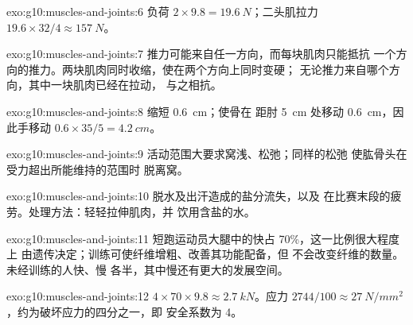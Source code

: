 \begin{solution}{exo:g10:muscles-and-joints:6}
负荷 $2 \times 9.8 = \qty{19.6}{N}$；二头肌拉力 $19.6 \times 32/4
\approx \qty{157}{N}$。
\end{solution}

\begin{solution}{exo:g10:muscles-and-joints:7}
推力可能来自任一方向，而每块肌肉只能抵抗
一个方向的推力。两块肌肉同时收缩，使在两个方向上同时变硬；
无论推力来自哪个方向，其中一块肌肉已经在拉动，
与之相抗。
\end{solution}

\begin{solution}{exo:g10:muscles-and-joints:8}
缩短 \qty{0.6}{cm}；使骨在
距肘 \qty{5}{cm} 处移动 \qty{0.6}{cm}，因此手移动
$0.6 \times 35/5 = \qty{4.2}{cm}$。
\end{solution}

\begin{solution}{exo:g10:muscles-and-joints:9}
活动范围大要求窝浅、松弛；同样的松弛
使肱骨头在受力超出所能维持的范围时
脱离窝。
\end{solution}

\begin{solution}{exo:g10:muscles-and-joints:10}
脱水及出汗造成的盐分流失，以及
在比赛末段的疲劳。处理方法：轻轻拉伸肌肉，并
饮用含盐的水。
\end{solution}

\begin{solution}{exo:g10:muscles-and-joints:11}
短跑运动员大腿中的快占 70\%，这一比例很大程度上
由遗传决定；训练可使纤维增粗、改善其功能配备，但
不会改变纤维的数量。未经训练的人快、慢
各半，其中慢还有更大的发展空间。
\end{solution}

\begin{solution}{exo:g10:muscles-and-joints:12}
$4 \times 70 \times 9.8 \approx \qty{2.7}{kN}$。应力 $2744/100
\approx \qty{27}{N/mm^2}$，约为破坏应力的四分之一，即
安全系数为 4。
\end{solution}

